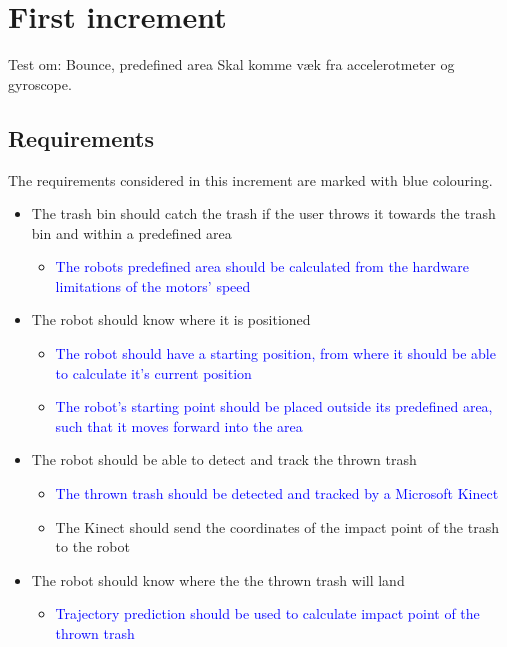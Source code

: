 \chapter{First increment}
\label{chap:First Increment}
Test om: Bounce, predefined area
Skal komme væk fra accelerotmeter og gyroscope. 

\section{Requirements}
\label{sec:i1Requirements}
The requirements considered in this increment are marked with blue colouring.

\begin{itemize}
\item The trash bin should catch the trash if the user throws it towards the trash bin and within a predefined area
\begin{itemize}
\item \textcolor{blue}{The robots predefined area should be calculated from the hardware limitations of the motors’ speed}
\end{itemize}
\item The robot should know where it is positioned
\begin{itemize}
\item \textcolor{blue}{The robot should have a starting position, from where it should be able to calculate it's current position}
\item \textcolor{blue}{The robot's starting point should be placed outside its predefined area, such that it moves forward into the area}
\end{itemize}
\item The robot should be able to detect and track the thrown trash
\begin{itemize}
\item \textcolor{blue}{The thrown trash should be detected and tracked by a Microsoft Kinect}
\item The Kinect should send the coordinates of the impact point of the trash to the robot
\end{itemize}
\item The robot should know where the the thrown trash will land
\begin{itemize}
\item \textcolor{blue}{Trajectory prediction should be used to calculate impact point of the thrown trash}

\end{itemize}
\end{itemize}
